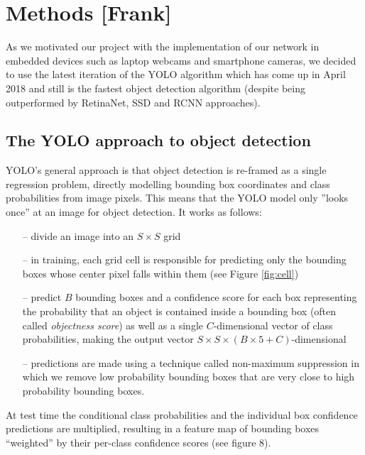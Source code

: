 \documentclass[a4paper]{article}
\begin{document}
\section{Methods [Frank]}
As we motivated our project with the implementation of our network in embedded devices such as laptop webcams and smartphone cameras, we decided to use the latest iteration of the YOLO algorithm which has come up in April 2018 and still is the fastest object detection algorithm (despite being outperformed by RetinaNet, SSD and RCNN approaches).
\subsection*{The YOLO approach to object detection}
YOLO's general approach is that object detection is re-framed as a single regression problem, directly
modelling bounding box coordinates and class
probabilities from image pixels. This means that the YOLO model only ”looks
once” at an image for object detection.
It works as follows: 
\begin{itemize}
\item[--] divide an image into an $S\times S$ grid
\item[--] in training, each grid cell is responsible for predicting only the bounding boxes whose center pixel falls within them (see Figure \ref{fig:cell})
\item[--]  predict $B$ bounding boxes and a confidence score for each box representing the probability that an object is contained inside a bounding box (often called \textit{objectness score}) as well as a single $C$-dimensional vector of class probabilities, making the output vector $S \times S \times (B\times 5 +C)$-dimensional

\item[--] predictions are made using a technique called non-maximum suppression in which we remove low probability bounding boxes that are very close to high probability bounding boxes. 
\end{itemize}  At test time the conditional class probabilities and the individual box confidence predictions are multiplied, resulting in a feature map of bounding boxes ``weighted'' by their per-class confidence scores (see figure 8).
\end{document}
